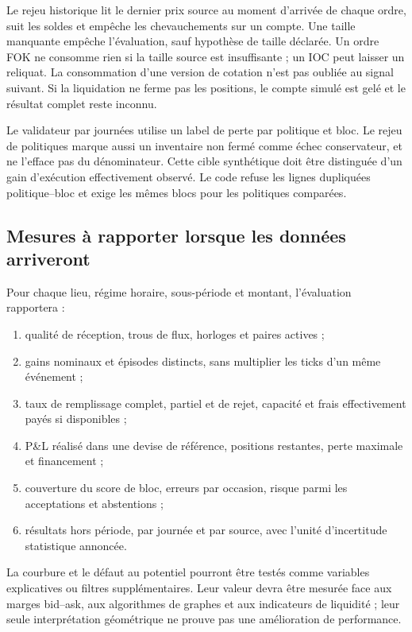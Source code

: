Le rejeu historique lit le dernier prix source au moment d'arrivée de chaque ordre, suit les soldes et empêche les chevauchements sur un compte. Une taille manquante empêche l'évaluation, sauf hypothèse de taille déclarée. Un ordre FOK ne consomme rien si la taille source est insuffisante ; un IOC peut laisser un reliquat. La consommation d'une version de cotation n'est pas oubliée au signal suivant. Si la liquidation ne ferme pas les positions, le compte simulé est gelé et le résultat complet reste inconnu.

Le validateur par journées utilise un label de perte par politique et bloc. Le rejeu de politiques marque aussi un inventaire non fermé comme échec conservateur, et ne l'efface pas du dénominateur. Cette cible synthétique doit être distinguée d'un gain d'exécution effectivement observé. Le code refuse les lignes dupliquées politique--bloc et exige les mêmes blocs pour les politiques comparées.

\subsection{Mesures à rapporter lorsque les données arriveront}

Pour chaque lieu, régime horaire, sous-période et montant, l'évaluation rapportera :
\begin{enumerate}
\item qualité de réception, trous de flux, horloges et paires actives ;
\item gains nominaux et épisodes distincts, sans multiplier les ticks d'un même événement ;
\item taux de remplissage complet, partiel et de rejet, capacité et frais effectivement payés si disponibles ;
\item P\&L réalisé dans une devise de référence, positions restantes, perte maximale et financement ;
\item couverture du score de bloc, erreurs par occasion, risque parmi les acceptations et abstentions ;
\item résultats hors période, par journée et par source, avec l'unité d'incertitude statistique annoncée.
\end{enumerate}
La courbure et le défaut au potentiel pourront être testés comme variables explicatives ou filtres supplémentaires. Leur valeur devra être mesurée face aux marges bid--ask, aux algorithmes de graphes et aux indicateurs de liquidité ; leur seule interprétation géométrique ne prouve pas une amélioration de performance.

